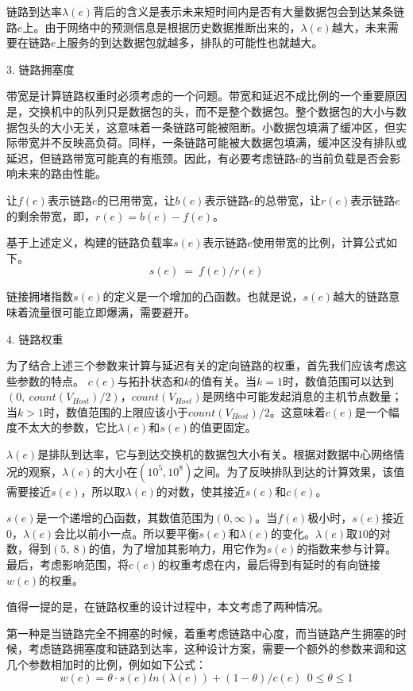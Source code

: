 链路到达率$\lambda(e)$背后的含义是表示未来短时间内是否有大量数据包会到达某条链路$e$上。由于网络中的预测信息是根据历史数据推断出来的，$\lambda(e)$越大，未来需要在链路$e$上服务的到达数据包就越多，排队的可能性也就越大。

3. 链路拥塞度

带宽是计算链路权重时必须考虑的一个问题。带宽和延迟不成比例的一个重要原因是，交换机中的队列只是数据包的头，而不是整个数据包。整个数据包的大小与数据包头的大小无关，这意味着一条链路可能被阻断。小数据包填满了缓冲区，但实际带宽并不反映高负荷。同样，一条链路可能被大数据包填满，缓冲区没有排队或延迟，但链路带宽可能真的有瓶颈。因此，有必要考虑链路e的当前负载是否会影响未来的路由性能。

让$f(e)$表示链路$e$的已用带宽，让$b(e)$表示链路$e$的总带宽，让$r(e)$表示链路$e$的剩余带宽，即，$r(e)=b(e)-f(e)$。

基于上述定义，构建的链路负载率$s(e)$表示链路$e$使用带宽的比例，计算公式如下。
$$s(e)\ =\ f(e)/r(e)$$

链接拥堵指数$s(e)$的定义是一个增加的凸函数。也就是说，$s(e)$越大的链路意味着流量很可能立即爆满，需要避开。

4. 链路权重

为了结合上述三个参数来计算与延迟有关的定向链路的权重，首先我们应该考虑这些参数的特点。
$c(e)$与拓扑状态和$k$的值有关。当$k=1$时，数值范围可以达到$(0,\ count(V_{Host})/2)，count(V_{Host})$是网络中可能发起消息的主机节点数量；当$k>1$时，数值范围的上限应该小于$count(V_{Host})/2$。这意味着$c(e)$是一个幅度不太大的参数，它比$\lambda(e)$和$s(e)$的值更固定。

$\lambda(e)$是排队到达率，它与到达交换机的数据包大小有关。根据对数据中心网络情况的观察，$\lambda(e)$的大小在$({10}^5,{10}^8)$之间。为了反映排队到达的计算效果，该值需要接近$s(e)$，所以取$\lambda(e)$的对数，使其接近$s(e)$和$c(e)$。

$s(e)$是一个递增的凸函数，其数值范围为$\left(0,\infty\right)$。当$f(e)$极小时，$s(e)$接近0，$\lambda(e)$会比以前小一点。所以要平衡$s(e)$和$\lambda(e)$的变化。$\lambda(e)$取$10$的对数，得到$\left(5,\ 8\right)$的值，为了增加其影响力，用它作为$s(e)$的指数来参与计算。最后，考虑影响范围，将$c(e)$的权重考虑在内，最后得到有延时的有向链接$w(e)$的权重。

值得一提的是，在链路权重的设计过程中，本文考虑了两种情况。

第一种是当链路完全不拥塞的时候，着重考虑链路中心度，而当链路产生拥塞的时候，考虑链路拥塞度和链路到达率，这种设计方案，需要一个额外的参数来调和这几个参数相加时的比例，例如如下公式：
$$w(e)=\theta \cdot s(e)ln(λ(e)) +(1- \theta )/c(e) \ \  0 \le \theta \le 1$$

